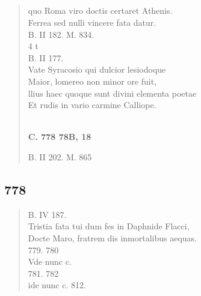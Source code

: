 \documentclass[11pt, a4paper]{report}
\begin{document}
            \subsection*{}
      \begin{verse}
      quo Roma viro doctis certaret Athenis. \\ Ferrea sed nulli vincere fata datur. \\ B. II 182. M. 834. \\ 4 t \\ B. II 177. \\ Vate Syracosio qui dulcior lesiodoque \\ Maior, lomereo non minor ore fuit, \\ llius haec quoque sunt divini elementa poetae \\ Et rudis in vario carmine Calliope. \\ 
        ﻿\pagebreak 
     \marginpar{[262]} \begin{center} \textbf{C. 778 78B, 18} \end{center}B. II 202. M. 865 \\ 
      \end{verse}
  
            \subsection*{778}
      \begin{verse}
      B. IV 187. \\ Tristia fata tui dum fes in Daphnide Flacci, \\ Docte Maro, fratrem dis inmortalibus aequas. \\ 779. 780 \\ Vde nunc c. \\ 781. 782 \\ ide nunc c. 812. \\ 
      \end{verse}
  
\end{document}
